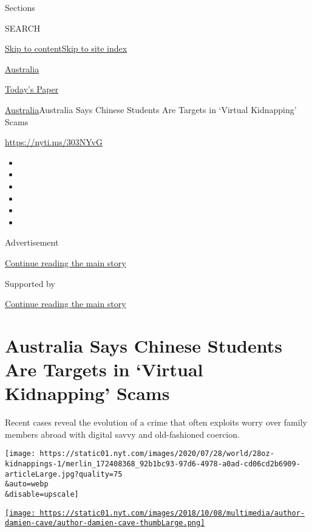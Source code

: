 Sections

SEARCH

\protect\hyperlink{site-content}{Skip to
content}\protect\hyperlink{site-index}{Skip to site index}

\href{https://www.nytimes.com/section/world/australia}{Australia}

\href{https://myaccount.nytimes.com/auth/login?response_type=cookie\&client_id=vi}{}

\href{https://www.nytimes.com/section/todayspaper}{Today's Paper}

\href{/section/world/australia}{Australia}\textbar{}Australia Says
Chinese Students Are Targets in `Virtual Kidnapping' Scams

\url{https://nyti.ms/303NYvG}

\begin{itemize}
\item
\item
\item
\item
\item
\item
\end{itemize}

Advertisement

\protect\hyperlink{after-top}{Continue reading the main story}

Supported by

\protect\hyperlink{after-sponsor}{Continue reading the main story}

\hypertarget{australia-says-chinese-students-are-targets-in-virtual-kidnapping-scams}{%
\section{Australia Says Chinese Students Are Targets in `Virtual
Kidnapping'
Scams}\label{australia-says-chinese-students-are-targets-in-virtual-kidnapping-scams}}

Recent cases reveal the evolution of a crime that often exploits worry
over family members abroad with digital savvy and old-fashioned
coercion.

\texttt{[image: https://static01.nyt.com/images/2020/07/28/world/28oz-kidnappings-1/merlin\_172408368\_92b1bc93-97d6-4978-a0ad-cd06cd2b6909-articleLarge.jpg?quality=75\\\&auto=webp\\\&disable=upscale]}

\href{https://www.nytimes.com/by/damien-cave}{\texttt{[image: https://static01.nyt.com/images/2018/10/08/multimedia/author-damien-cave/author-damien-cave-thumbLarge.png]}}

